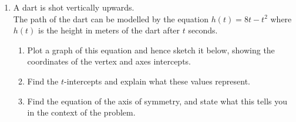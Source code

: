 \documentclass[12pt, twoside]{article}
\begin{document}
\begin{enumerate}
\newpage
\item A dart is shot vertically upwards.\\[0.25cm]
The path of the dart can be modelled by the equation $h(t)=8t-t^2$ where $h(t)$ is the height in meters of the dart after $t$ seconds.
    \begin{enumerate}
        \item Plot a graph of this equation and hence sketch it below, showing the coordinates of the vertex and axes intercepts.
        \item Find the $t$-intercepts and explain what these values represent. \vspace{2cm}
        \item Find the equation of the axis of symmetry, and state what this tells you in the context of the problem. \vspace{2cm}
    \end{enumerate}
    \begin{center}
    \end{center}

\end{enumerate}
\end{document}
